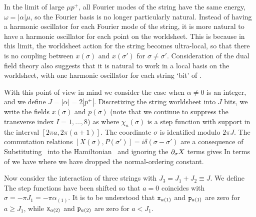 In the limit of large $\mu p^+$,
all Fourier modes of the string have the same
energy, $\omega = |\alpha| \mu$, so the Fourier basis is no longer
particularly natural.
Instead of having a harmonic oscillator for each Fourier mode of the
string, it is more natural to have a harmonic oscillator for each
point on the worldsheet.  This is because in this limit,
the worldsheet action for the string becomes
ultra-local, so that there is no coupling between $x(\sigma)$ and
$x(\sigma')$ for $\sigma \ne \sigma'$.
Consideration of the dual field theory also suggests that it is
natural to work in a local basis on the worldsheet, with one
harmonic oscillator for each string `bit' of \BMN.

With this point of view in mind we consider the case when
$\alpha \ne 0$ is an integer, and
we define $J = |\alpha| = 2 |p^+|$.
Discretizing the string worldsheet into $J$ bits, we write
the fields $x(\sigma)$ and $p(\sigma)$ (note that we continue to
suppress the transverse index $I=1,\ldots,8$) as
\eqn{}
where $\chi_a(\sigma)$ is a step function with support
in the interval $[2 \pi a, 2 \pi (a+1)]$.
The coordinate $\sigma$ is identified modulo $2 \pi J$.
The commutation relations $[X(\sigma), P(\sigma')] = i\delta(\sigma-
\sigma')$ are a consequence of
\eqn{}
Substituting \coolxandp\ into
the Hamiltonian \hghd\ and ignoring the $\partial_\sigma X$
terms gives
\eqn{}
In terms of
\eqn{}
we have
\eqn{}
where we have dropped the normal-ordering constant.

Now consider the interaction of three strings with
$J_3 = J_1 + J_2 \equiv J$.
We define
\eqn{}
The step functions have been shifted so that $a = 0$ coincides with
$\sigma = - \pi J_1 = - \pi \alpha_{(1)}$.
It is to be understood that
${\tt x}_{a(1)}$ and ${\tt p}_{a(1)}$ are zero for
$a \ge J_1$, while ${\tt x}_{a(2)}$ and ${\tt p}_{a(2)}$
are zero for $a < J_1$.

